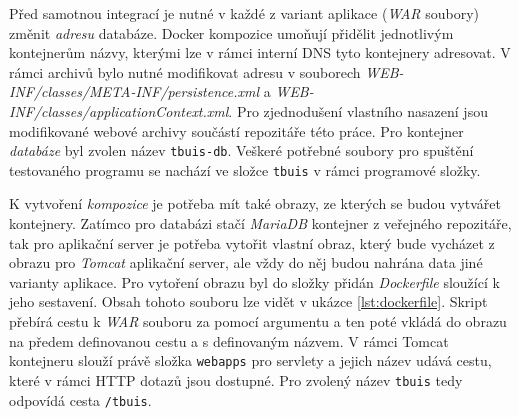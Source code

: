 \documentclass[czech, ma, kiv, he, iso690alph, pdf, viewonly]{fasthesis}
\begin{document}
    Před samotnou integrací je nutné v každé z variant aplikace (\textit{WAR} soubory) změnit \textit{adresu} databáze. Docker kompozice umoňují přidělit jednotlivým kontejnerům názvy, kterými lze v rámci interní DNS tyto kontejnery adresovat. V rámci archivů bylo nutné modifikovat adresu v souborech \textit{WEB-INF/classes/META-INF/persistence.xml} a \textit{WEB-INF/classes/applicationContext.xml}. Pro zjednodušení vlastního nasazení jsou modifikované webové archivy součástí repozitáře této práce. Pro kontejner \textit{databáze} byl zvolen název \verb|tbuis-db|. Veškeré potřebné soubory pro spuštění testovaného programu se nachází ve složce \verb|tbuis| v rámci programové složky.

    K vytvoření \textit{kompozice} je potřeba mít také obrazy, ze kterých se budou vytvářet kontejnery. Zatímco pro databázi stačí \textit{MariaDB} kontejner z veřejného repozitáře, tak pro aplikační server je potřeba vytořit vlastní obraz, který bude vycházet z obrazu pro \textit{Tomcat} aplikační server, ale vždy do něj budou nahrána data jiné varianty aplikace. Pro vytoření obrazu byl do složky přidán \textit{Dockerfile} sloužící k jeho sestavení. Obsah tohoto souboru lze vidět v ukázce \ref{lst:dockerfile}. Skript přebírá cestu k \textit{WAR} souboru za pomocí argumentu a ten poté vkládá do obrazu na předem definovanou cestu a s definovaným názvem. V rámci Tomcat kontejneru slouží právě složka \verb|webapps| pro servlety a jejich název udává cestu, které v rámci HTTP dotazů jsou dostupné. Pro zvolený název \verb|tbuis| tedy odpovídá cesta \verb|/tbuis|.

\end{document}
